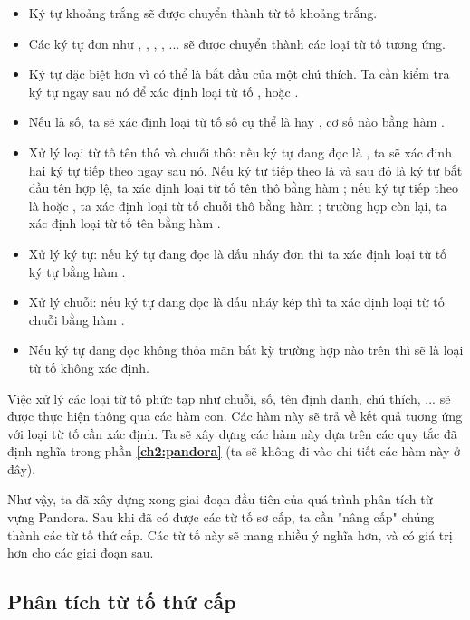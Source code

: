 \begin{itemize}
    \item Ký tự khoảng trắng sẽ được chuyển thành từ tố khoảng trắng.
    \item Các ký tự đơn như , , , , ... sẽ được chuyển thành các loại từ tố tương ứng.
    \item Ký tự \kw{/} đặc biệt hơn vì có thể là bắt đầu của một chú thích. Ta cần kiểm tra ký tự ngay sau nó để xác định loại từ tố ,  hoặc .
    \item Nếu là số, ta sẽ xác định loại từ tố số cụ thể là  hay , cơ số nào bằng hàm .
    \item Xử lý loại từ tố tên thô và chuỗi thô: nếu ký tự đang đọc là , ta sẽ xác định hai ký tự tiếp theo ngay sau nó. Nếu ký tự tiếp theo là \kw{\#} và sau đó là ký tự bắt đầu tên hợp lệ, ta xác định loại từ tố tên thô bằng hàm ; nếu ký tự tiếp theo là \kw{\#} hoặc , ta xác định loại từ tố chuỗi thô bằng hàm ; trường hợp còn lại, ta xác định loại từ tố tên bằng hàm .
    \item Xử lý ký tự: nếu ký tự đang đọc là dấu nháy đơn  thì ta xác định loại từ tố ký tự bằng hàm .
    \item Xử lý chuỗi: nếu ký tự đang đọc là dấu nháy kép  thì ta xác định loại từ tố chuỗi bằng hàm .
    \item Nếu ký tự đang đọc không thỏa mãn bất kỳ trường hợp nào trên thì sẽ là loại từ tố không xác định.
\end{itemize}

Việc xử lý các loại từ tố phức tạp như chuỗi, số, tên định danh, chú thích, ... sẽ được thực hiện thông qua các hàm con. Các hàm này sẽ trả về kết quả tương ứng với loại từ tố cần xác định. Ta sẽ xây dựng các hàm này dựa trên các quy tắc đã định nghĩa trong phần \textbf{\ref{ch2:pandora}} (ta sẽ không đi vào chi tiết các hàm này ở đây).

    Như vậy, ta đã xây dựng xong giai đoạn đầu tiên của quá trình phân tích từ vựng Pandora. Sau khi đã có được các từ tố sơ cấp, ta cần "nâng cấp" chúng thành các từ tố thứ cấp. Các từ tố này sẽ mang nhiều ý nghĩa hơn, và có giá trị hơn cho các giai đoạn sau.

\subsection{Phân tích từ tố thứ cấp}

